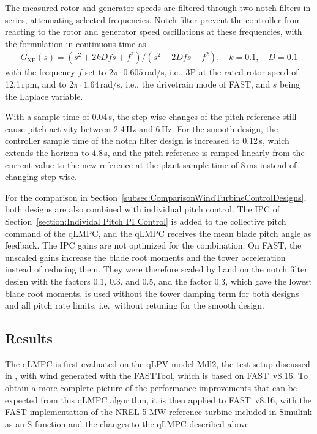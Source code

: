 
The measured rotor and generator speeds are filtered through two notch filters in series, attenuating selected frequencies. Notch filter prevent the controller from reacting to the rotor and generator speed oscillations at these frequencies, with the formulation in continuous time as
\begin{align*}
    G_\text{NF}(s) = (s^2 + 2kDfs + f^2)/(s^2 + 2Dfs + f^2), \quad k = 0.1, \quad D = 0.1
\end{align*}
with the frequency $f$  set to $2\pi \cdot 0.605$\,rad/s, i.e., 3P at the rated rotor speed of 12.1\,rpm, and to $2\pi \cdot 1.64$\,rad/s, i.e., the drivetrain mode of FAST, and $s$ being the Laplace variable.



 With a sample time of 0.04\,s, the step-wise changes of the pitch reference still cause pitch activity between 2.4\,Hz and 6\,Hz. For the smooth design, the controller sample time of the notch filter design is increased to 0.12\,s, which extends the horizon to 4.8\,s, and the pitch reference is ramped linearly from the current value to the new reference at the plant sample time of 8\,ms instead of changing step-wise.

For the comparison in Section~\ref{subsec:ComparisonWindTurbineControlDesigns}, both designs are also combined with individual pitch control. The IPC of Section~\ref{section:Individal Pitch PI Control} is added to the collective pitch command of the qLMPC, and the qLMPC receives the mean blade pitch angle as feedback. The IPC gains are not optimized for the combination. On FAST, the unscaled gains increase the blade root moments and the tower acceleration instead of reducing them. They were therefore scaled by hand on the notch filter design with the factors 0.1, 0.3, and 0.5, and the factor 0.3, which gave the lowest blade root moments, is used without the tower damping term for both designs and all pitch rate limits, i.e.\ without retuning for the smooth design.

\subsection{Results} \label{quasiLPVMPCResults}
The qLMPC is first evaluated on the qLPV model Mdl2, the test setup discussed in \cite{dittmer2021velocity}, with wind generated with the FASTTool, which is based on FAST~v8.16. To obtain a more complete picture of the performance improvements that can be expected from this qLMPC algorithm, it is then applied to FAST~v8.16, with the FAST implementation of the NREL 5-MW reference turbine included in Simulink as an S-function and the changes to the qLMPC described above.

